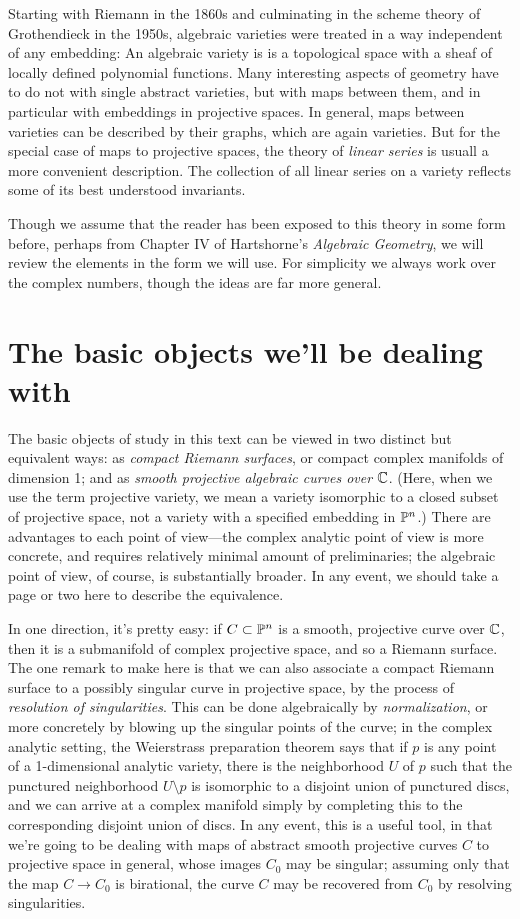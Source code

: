 Starting with Riemann in the 1860s and culminating in the scheme theory of Grothendieck in the 1950s, algebraic varieties were treated in a way independent of any embedding: An algebraic variety is is a topological space with a sheaf of locally
defined polynomial functions. Many interesting aspects of geometry have to do not with single abstract varieties, but with maps between them, and in particular with embeddings in projective spaces. In general, maps between varieties can be described by their graphs, which are again varieties.  But for the special case of maps to projective spaces, the theory of \emph{linear series} is usuall a more convenient description. The collection of all linear series on a variety reflects some of its best understood invariants. 

Though we assume that the reader has been exposed to this theory in some form before, perhaps from Chapter IV of Hartshorne's {\it Algebraic Geometry}, we will review the elements  in the form we will use. For simplicity we always work over the complex numbers, though the ideas are far more general. 

\section{The basic objects we'll be dealing with}

The basic objects of study in this text can be viewed in two distinct but equivalent ways: as \emph{compact Riemann surfaces}, or compact complex manifolds of dimension 1; and as \emph{smooth projective algebraic curves over $\CC$}. (Here, when we use the term projective variety, we mean a variety isomorphic to a closed subset of projective space, not a variety with a specified embedding in $\PP^n$.) There are advantages to each point of view---the complex analytic point of view is more concrete, and requires relatively minimal amount of preliminaries; the algebraic point of view, of course, is substantially broader. In any event, we should take a page or two here to describe the equivalence.

In one direction, it's pretty easy: if $C \subset \PP^n$ is a smooth, projective curve over $\CC$, then it is a submanifold of complex projective space, and so a Riemann surface. The one remark to make here is that we can also associate a compact Riemann surface to a possibly singular curve in projective space, by the process of \emph{resolution of singularities}. This can be done algebraically by \emph{normalization}, or more concretely by blowing up the singular points of the curve; in the complex analytic setting, the Weierstrass preparation theorem says that if $p$ is any point of a 1-dimensional analytic variety, there is the neighborhood $U$ of $p$ such that the punctured neighborhood $U \setminus p$ is isomorphic to a disjoint union of punctured discs, and we can arrive at a complex manifold simply by completing this to the corresponding disjoint union of discs.
In any event,   this is a useful tool, in that we're going to be dealing with maps of abstract smooth projective curves $C$ to projective space in general, whose images $C_0$ may be singular; assuming only that the map $C \to C_0$ is birational, the curve $C$ may be recovered from $C_0$ by resolving singularities. 


